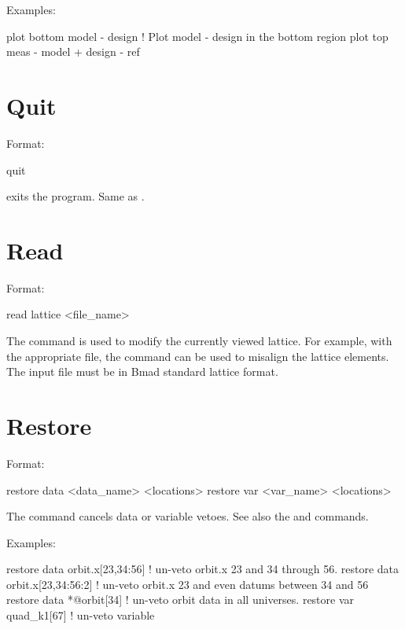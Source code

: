 {Examples:
\begin{example}
  plot bottom model - design       ! Plot model - design in the bottom region
  plot top meas - model + design - ref 
\end{example}

\section{Quit}
\label{s:quit}

Format:
\begin{example}
  quit
\end{example}

\vskip 0.2in
 exits the program. Same as .

\section{Read}
\label{s:read}

Format:
\begin{example}
  read lattice <file_name>
\end{example}

\vskip 0.2in 
The  command is used to modify the currently
viewed  lattice. For example, with the appropriate file,
the  command can be used to misalign the lattice
elements. The input file must be in Bmad standard lattice format.

\section{Restore}
\label{s:restore}

Format:
\begin{example}
  restore data  <data_name> <locations>
  restore var <var_name> <locations>
\end{example}

\vskip 0.2in 
The  command cancels data or variable
vetoes. See also the 
and  commands.

Examples:
\begin{example}
  restore data orbit.x[23,34:56]   ! un-veto orbit.x 23 and 34 through 56.
  restore data orbit.x[23,34:56:2] ! un-veto orbit.x 23 and even datums between 34 and 56
  restore data *@orbit[34]         ! un-veto orbit data in all universes.
  restore var quad_k1[67]          ! un-veto variable
\end{example}

}
